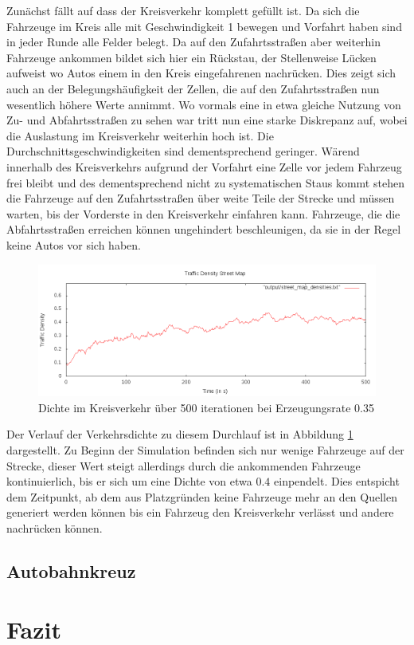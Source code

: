 \documentclass[11pt, a4paper]{article}
\newcommand\myref[1]{\ref{#1} (S. \pageref{#1})}
\newcommand\myrefcomma[1]{\ref{#1}, S. \pageref{#1}}
\begin{document}
Zunächst fällt auf dass der Kreisverkehr komplett gefüllt ist. Da sich die Fahrzeuge im Kreis alle mit Geschwindigkeit 1 bewegen und Vorfahrt haben sind in jeder Runde alle Felder belegt. Da auf den Zufahrtsstraßen aber weiterhin Fahrzeuge ankommen bildet sich hier ein Rückstau, der Stellenweise Lücken aufweist wo Autos einem in den Kreis eingefahrenen nachrücken. Dies zeigt sich auch an der Belegungshäufigkeit der Zellen, die auf den Zufahrtsstraßen nun wesentlich höhere Werte annimmt. Wo vormals eine in etwa gleiche Nutzung von Zu- und Abfahrtsstraßen zu sehen war tritt nun eine starke Diskrepanz auf, wobei die Auslastung im Kreisverkehr weiterhin hoch ist. Die Durchschnittsgeschwindigkeiten sind dementsprechend geringer. Wärend innerhalb des Kreisverkehrs aufgrund der Vorfahrt eine Zelle vor jedem Fahrzeug frei bleibt und des dementsprechend nicht zu systematischen Staus kommt stehen die Fahrzeuge auf den Zufahrtsstraßen über weite Teile der Strecke und müssen warten, bis der Vorderste in den Kreisverkehr einfahren kann. Fahrzeuge, die die Abfahrtsstraßen erreichen können ungehindert beschleunigen, da sie in der Regel keine Autos vor sich haben.

\begin{figure}[h!]
	\centering
	\includegraphics[width=\textwidth]{img/roundabout_035_densities}
	\caption{Dichte im Kreisverkehr über 500 iterationen bei Erzeugungsrate 0.35}
	\label{fig:roundabout035density}
\end{figure}

Der Verlauf der Verkehrsdichte zu diesem Durchlauf ist in Abbildung \ref{fig:roundabout035density} dargestellt. Zu Beginn der Simulation befinden sich nur wenige Fahrzeuge auf der Strecke, dieser Wert steigt allerdings durch die ankommenden Fahrzeuge kontinuierlich, bis er sich um eine Dichte von etwa $0.4$ einpendelt. Dies entspicht dem Zeitpunkt, ab dem aus Platzgründen keine Fahrzeuge mehr an den Quellen generiert werden können bis ein Fahrzeug den Kreisverkehr verlässt und andere nachrücken können.

\subsection{Autobahnkreuz}

\newpage
\section{Fazit}
\label{sec:fazit}


\newpage
{}
{}

\end{document}
